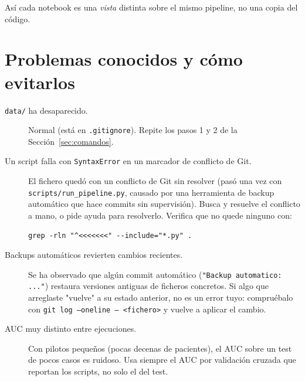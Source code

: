 \documentclass[11pt,a4paper]{article}
\begin{document}
Así cada notebook es una \emph{vista} distinta sobre el mismo pipeline, no una
copia del código.

\section{Problemas conocidos y cómo evitarlos}

\begin{description}
  \item[\texttt{data/} ha desaparecido.] Normal (está en \texttt{.gitignore}).
    Repite los pasos 1 y 2 de la Sección~\ref{sec:comandos}.
  \item[Un script falla con \texttt{SyntaxError} en un marcador de conflicto de Git.]
    El fichero quedó con un conflicto de Git sin
    resolver (pasó una vez con \texttt{scripts/run\_pipeline.py}, causado por
    una herramienta de backup automático que hace commits sin supervisión).
    Busca y resuelve el conflicto a mano, o pide ayuda para resolverlo.
    Verifica que no quede ninguno con:
    \begin{lstlisting}
grep -rln "^<<<<<<<" --include="*.py" .
    \end{lstlisting}
  \item[Backups automáticos revierten cambios recientes.] Se ha observado que
    algún commit automático (\texttt{"Backup automatico: ..."}) restaura
    versiones antiguas de ficheros concretos. Si algo que arreglaste
    "vuelve" a su estado anterior, no es un error tuyo: compruébalo con
    \texttt{git log --oneline -- <fichero>} y vuelve a aplicar el cambio.
  \item[AUC muy distinto entre ejecuciones.] Con pilotos pequeños (pocas
    decenas de pacientes), el AUC sobre un test de pocos casos es ruidoso.
    Usa siempre el AUC por validación cruzada que reportan los scripts, no
    solo el del test.
\end{description}
\end{document}
